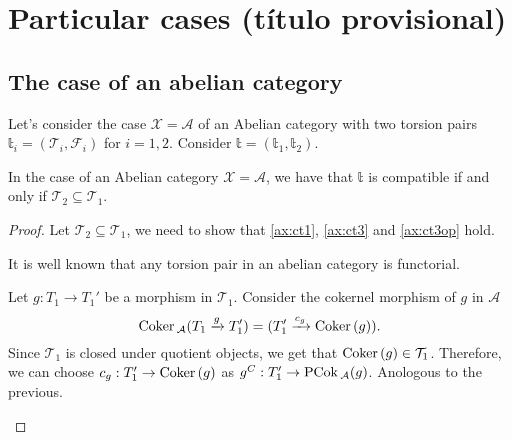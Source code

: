 \clearpage














\section{Particular cases (t\'itulo provisional)}
\subsection{The case of an abelian category}

Let's consider the case $\mathcal{X}=\mathcal{A}$ of an Abelian category with
two torsion pairs $\mathbb{t}_i=(\mathcal{T}_i,\mathcal{F}_i)$ for $i=1,2$.
Consider $\mathbb{t}=(\mathbb{t}_1,\mathbb{t}_2)$.

\begin{rmk}\label{rmk:2.2}
  In the case of an Abelian category $\mathcal{X}=\mathcal{A}$, we have that
  $\mathbb{t}$ is compatible if and only if $\mathcal{T}_2\subseteq\mathcal{T}_1$.
\end{rmk}

\begin{proof}
  Let $\mathcal{T}_2\subseteq\mathcal{T}_1$, we need to show that \cref{ax:ct1},
  \cref{ax:ct3} and \cref{ax:ct3op} hold.
  \begin{torsionaxioms}
    \item It is well known that any torsion pair in an abelian category is functorial.
    \setcounter{enumi}{2}
    \item Let $g:T_1\to T_1'$ be a morphism in $\mathcal{T}_1$. Consider the cokernel morphism
    of $g$ in $\mathcal{A}$
    \begin{equation*}
      \mathrm{\textup{Coker\,}}_\mathcal{A}(T_1\xrightarrow{g}T_1')=(T_1'\xrightarrow{c_g}\mathrm{\textup{Coker\,}}(g)).
    \end{equation*}
    Since $\mathcal{T}_1$ is closed under quotient objects, we get that $\mathrm{\textup{Coker\,}}(g)\in\mathcal{T}_1$.
    Therefore, we can choose $c_g:T_1'\to\mathrm{\textup{Coker\,}}(g)$ as $g^C:T_1'\to\mathrm{\textup{PCok\,}}_\mathcal{A}(g)$.
    \varitem{^\ast} Anologous to the previous.
  \end{torsionaxioms}
\end{proof}

